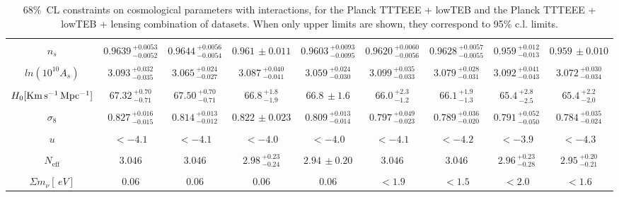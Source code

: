 \documentclass[aps,prd,a4paper,twocolumn,amsmath,showpacs,superscriptaddress,nofootinbib,preprintnumbers]{revtex4-1}
\newcommand{\neff}{N_{\mathrm{eff}}}
\newcommand{\mnu}{{\Sigma}m_{\nu}}
\begin{document}
\begin{table*}
\begin{center}
{\begin{tabular}{c|cccccccc}
\hspace{1mm}\\
$n_s$ &  $0.9639\,^{+0.0053}_{-0.0052}$&$0.9644\,^{+0.0056}_{-0.0054}$  & $0.961\,\pm 0.011$&$0.9603\,^{+0.0093}_{-0.0095}$ &  $0.9620\,^{+0.0060}_{-0.0056}$&$0.9628\,_{-0.0055}^{+0.0057}$  & $0.959\,_{-0.013}^{+0.012} $&$0.959\,\pm 0.010$  \\
\hspace{1mm}\\
$ln(10^{10}A_s)$ & $3.093\,^{+0.032}_{-0.035}$& $3.065\,^{+0.024}_{-0.027}$& $3.087\,_{-0.041}^{+0.040}$& $3.059\,^{+0.024}_{-0.030}$ & $3.099\,^{+0.035}_{-0.033}$& $3.079\,^{+0.028}_{-0.031}$& $3.092\, _{-0.043}^{+0.041}$& $3.072\,^{+0.030}_{-0.034}$\\
\hspace{1mm}\\
$H_0 [\rm{Km \, s^{-1} \, Mpc^{-1}}]$ &$67.32\,_{-0.71}^{+0.70}$ &$67.50\,^{+0.70}_{-0.71}$&$66.8\,^{+1.8}_{-1.9}$ &$66.8\,\pm 1.6$ &$66.0\,^{+2.3}_{-1.2}$ &$66.1\,^{+1.9}_{-1.3}$&$65.4\, ^{+2.8}_{-2.5}$ &$65.4\,^{+2.2}_{-2.0}$  \\
\hspace{1mm}\\
$\sigma_8$ &$0.827\,^{+0.016}_{-0.015}$& $0.814\,^{+0.013}_{-0.012}$  & $0.822\,\pm 0.023$& $0.809\,^{+0.013}_{-0.014}$ &$0.797\,_{-0.023}^{+0.049}$& $0.789\,^{+0.036}_{-0.020}$  & $0.791\,_{-0.050}^{+0.052}$& $0.784\,^{+0.035}_{-0.024}$ \\
\hspace{1mm}\\
$u$  & $<-4.1$&$<-4.1$&$<-4.0$&$<-4.0$  & $<-4.1 $&$<-4.2$&            $<-3.9$&$<-4.3$\\
\hspace{1mm}\\
$\neff$ &         $3.046$ &$3.046$& $2.98\,^{+0.23}_{-0.24}$ &$2.94\,\pm 0.20$&         $3.046$ &$3.046$ & $2.96\,^{+0.23}_{-0.28}$ &$2.95\,^{+0.20}_{-0.21}$ \\
\hspace{1mm}\\
$\mnu [\, eV]$ &              $0.06$&$0.06$&$0.06$&$0.06$&$<1.9$&$<1.5$&$<2.0$&$<1.6$ \\
\hline
\end{tabular}}
\end{center}
\caption{$68\%$~CL constraints on cosmological parameters with interactions, for the Planck TTTEEE + lowTEB and the Planck TTTEEE + lowTEB + lensing combination of datasets. When only upper limits are shown, they correspond to 95\% c.l. limits.}
\label{tab:pol}
\end{table*}
\end{document}
